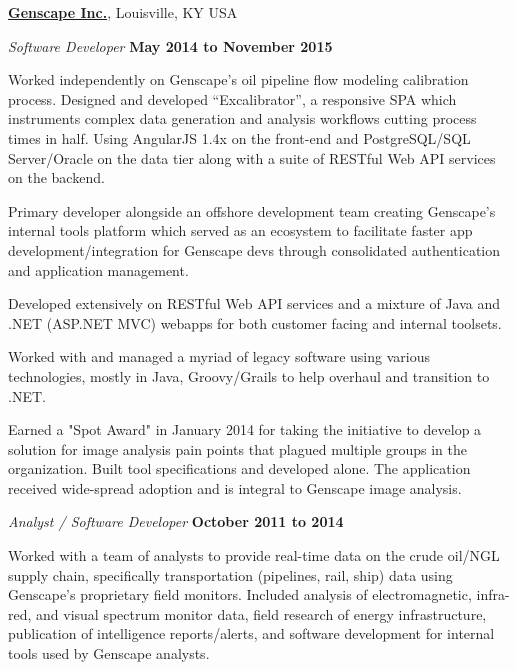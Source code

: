 \documentclass[10pt]{article}
\newenvironment{outerlist}[1][\enskip\textbullet]%
        {\begin{itemize}[#1]}{\end{itemize}%
         \vspace{-.6\baselineskip}}
\newenvironment{innerlist}[1][\enskip\textbullet]%
        {\begin{compactitem}[#1]}{\end{compactitem}}
\newcommand{\blankline}{\quad\pagebreak[2]}
\begin{document}
\href{https://www.genscape.com}{\textbf{Genscape Inc.}},
Louisville, KY USA
\begin{outerlist}
\item[] \textit{Software Developer}%
        \hfill \textbf{May 2014 to November 2015}
\begin{innerlist}
\item Worked independently on Genscape's oil pipeline flow modeling calibration process. Designed and developed ``Excalibrator'', a responsive SPA which instruments complex data generation and analysis workflows cutting process times in half. Using AngularJS 1.4x on the front-end and PostgreSQL/SQL Server/Oracle on the data tier along with a suite of RESTful Web API services on the backend.
\item Primary developer alongside an offshore development team creating Genscape's internal tools platform which served as an ecosystem to facilitate faster app development/integration for Genscape devs through consolidated authentication and application management.
\item Developed extensively on RESTful Web API services and a mixture of Java and .NET (ASP.NET MVC) webapps for both customer facing and internal toolsets.
\item Worked with and managed a myriad of legacy software using various technologies, mostly in Java, Groovy/Grails to help overhaul and transition to .NET.
\item Earned a "Spot Award" in January 2014 for taking the initiative to develop a solution for image analysis pain points that plagued multiple groups in the organization. Built tool specifications and developed alone. The application received wide-spread adoption and is integral to Genscape image analysis.
\end{innerlist}
\end{outerlist}
\blankline

\begin{outerlist}
\item[] \textit{Analyst / Software Developer}%
        \hfill \textbf{October 2011 to 2014}
\begin{innerlist}
\item Worked with a team of analysts to provide real-time data on the crude oil/NGL supply chain, specifically transportation (pipelines, rail, ship) data using Genscape's proprietary field monitors. Included analysis of electromagnetic, infra-red, and visual spectrum monitor data, field research of energy infrastructure, publication of intelligence reports/alerts, and software development for internal tools used by Genscape analysts.
\end{innerlist}
\end{outerlist}
\blankline
\end{document}
